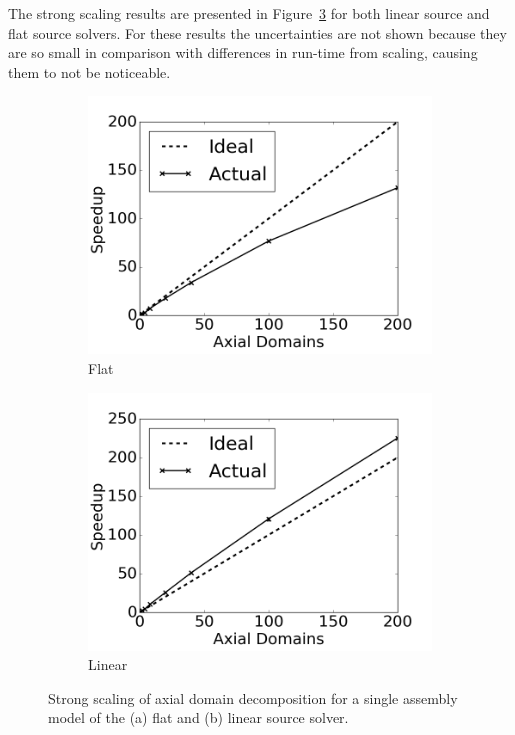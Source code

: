 The strong scaling results are presented in Figure~\ref{fig:strong-scaling-single-assembly-ts} for both linear source and flat source solvers. For these results the uncertainties are not shown because they are so small in comparison with differences in run-time from scaling, causing them to not be noticeable.
\begin{figure}[h!]
	\centering
	\begin{subfigure}{0.45\textwidth}
		\centering
		\includegraphics[width=\linewidth]{figures/DD/sa-scaling-fs-ts.png}
		\caption{Flat}
		\label{fig:dd-sa-fs}
	\end{subfigure}
	\begin{subfigure}{0.45\textwidth}
		\centering
		\includegraphics[width=\linewidth]{figures/DD/sa-scaling-ls-ts.png}
		\caption{Linear}
		\label{fig:dd-sa-ls}
	\end{subfigure}
	\caption[]{Strong scaling of axial domain decomposition for a single assembly model of the (a) flat and (b) linear source solver.}
	\label{fig:strong-scaling-single-assembly-ts}
\end{figure}


